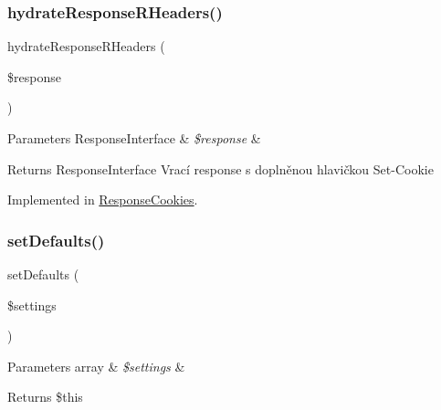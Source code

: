 \subsubsection{\texorpdfstring{hydrate\+Response\+R\+Headers()}{hydrateResponseRHeaders()}}
{\footnotesize\ttfamily hydrate\+Response\+R\+Headers (\begin{DoxyParamCaption}\item[{Response\+Interface}]{\$response }\end{DoxyParamCaption})}


\begin{DoxyParams}[1]{Parameters}
Response\+Interface & {\em \$response} & \\
\hline
\end{DoxyParams}
\begin{DoxyReturn}{Returns}
Response\+Interface Vrací response s doplněnou hlavičkou Set-\/\+Cookie 
\end{DoxyReturn}


Implemented in \mbox{\hyperlink{class_pes_1_1_http_1_1_cookies_1_1_response_cookies_a7e113803ed4166b2bab9f6f68ca75921}{Response\+Cookies}}.

\mbox{\label{interface_pes_1_1_http_1_1_cookies_1_1_response_cookies_interface_a462328426f473092af4994841a3bb3de}} 
\subsubsection{\texorpdfstring{set\+Defaults()}{setDefaults()}}
{\footnotesize\ttfamily set\+Defaults (\begin{DoxyParamCaption}\item[{array}]{\$settings }\end{DoxyParamCaption})}


\begin{DoxyParams}[1]{Parameters}
array & {\em \$settings} & \\
\hline
\end{DoxyParams}
\begin{DoxyReturn}{Returns}
\$this 
\end{DoxyReturn}


